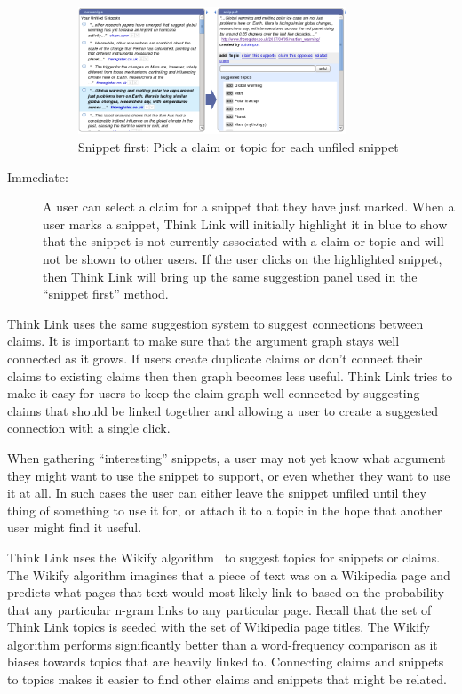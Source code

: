 \documentclass{chi2009}
\newcommand{\todo}[1]{}
\begin{document}
\begin{description}
\todo{Updated screenshot with ``enter new claim or search keywords'' present}

\begin{figure}[tb]
	\begin{center}
	\includegraphics[width=8cm]{../screenshots/v2_sniptopic.png}
	\caption{Snippet first: Pick a claim or topic for each unfiled snippet}
	\label{sniptopic}
	\end{center}
\end{figure}

\item[Immediate:] A user can select a claim for a snippet that they have just marked. When a user marks a snippet, Think Link will initially highlight it in blue to show that the snippet is not currently associated with a claim or topic and will not be shown to other users. If the user clicks on the highlighted snippet, then Think Link will bring up the same suggestion panel used in the ``snippet first'' method.
\end{description}

Think Link uses the same suggestion system to suggest connections between claims. It is important to make sure that the argument graph stays well connected as it grows. If users create duplicate claims or don't connect their claims to existing claims then then graph becomes less useful. Think Link tries to make it easy for users to keep the claim graph well connected by suggesting claims that should be linked together and allowing a user to create a suggested connection with a single click. 

When gathering ``interesting'' snippets, a user may not yet know what argument they might want to use the snippet to support, or even whether they want to use it at all. In such cases the user can either leave the snippet unfiled until they thing of something to use it for, or attach it to a topic in the hope that another user might find it useful.

Think Link uses the Wikify algorithm~\cite{Mihalcea2007} to suggest topics for snippets or claims. The Wikify algorithm imagines that a piece of text was on a Wikipedia page and predicts what pages that text would most likely link to based on the probability that any particular n-gram links to any particular page. Recall that the set of Think Link topics is seeded with the set of Wikipedia page titles. The Wikify algorithm performs significantly better than a word-frequency comparison as it biases towards topics that are heavily linked to. Connecting claims and snippets to topics makes it easier to find other claims and snippets that might be related.
\end{document}
